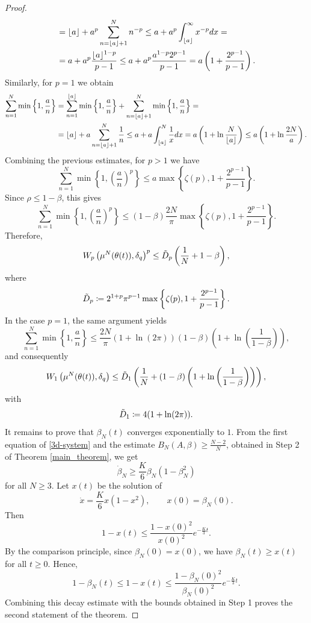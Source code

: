 \documentclass[10pt,a4paper]{amsart}
\renewcommand{\d}{\textnormal{d}}
\newcommand{\jump}{\hfill\break}
\begin{document}
\begin{proof}
\begin{align*}
           &=\lfloor a\rfloor +a^p\sum_{n=\lfloor a\rfloor+1}^N n^{-p}\leq a+a^p\int_{\lfloor a\rfloor}^\infty x^{-p}\d x=\\
           &=a+a^p\frac{\lfloor a \rfloor^{1-p}}{p-1}\leq a+a^p\frac{a^{1-p}2^{p-1}}{p-1}= a\left(1+\frac{2^{p-1}}{p-1}\right).
        \end{align*}
        Similarly, for $p=1$ we obtain
        \begin{align*}
            \sum_{n=1}^N\min\left\{1,\frac{a}{n}\right\}&=\sum_{n=1}^{\lfloor a\rfloor}\min\left\{1,\frac{a}{n}\right\}+\sum_{n=\lfloor a\rfloor+1}^N\min\left\{1,\frac{a}{n}\right\}=\\
            &=\lfloor a\rfloor +a\sum_{n=\lfloor a\rfloor+1}^N \frac{1}{n}\leq a+a\int_{\lfloor a\rfloor}^N \frac{1}{x}\d x=a\left(1+\ln\frac{N}{\lfloor a\rfloor}\right)\leq a\left(1+\ln\frac{2N}{a}\right).
        \end{align*}
        Combining the previous estimates, for $p>1$ we have
        $$ \sum_{n=1}^N \min\left\{1,\left(\frac{a}{n}\right)^p\right\} \leq a\max\left\{\zeta(p),1+\frac{2^{p-1}}{p-1}\right\}. $$
        Since $\rho\leq1-\beta$, this gives 
        $$ \sum_{n=1}^N \min\left\{1,\left(\frac{a}{n}\right)^p\right\} \leq (1-\beta)\frac{2N}{\pi} \max\left\{\zeta(p),1+\frac{2^{p-1}}{p-1}\right\}. $$
        Therefore,
        $$ W_p\left(\mu^N(\theta(t)),\delta_q\right)^p \leq \Tilde{D}_p \left( \frac{1}{N} + 1-\beta \right), $$
        where
        $$ \Tilde{D}_p\coloneqq 2^{1+p}\pi^{p-1} \max\left\{\zeta(p),1+\frac{2^{p-1}}{p-1}\right\}. $$
        In the case $p=1$, the same argument yields
        $$ \sum_{n=1}^N \min\left\{1,\frac{a}{n}\right\} \leq \frac{2N}{\pi} \left(1+\ln(2\pi)\right) (1-\beta) \left( 1+\ln\left(\frac{1}{1-\beta}\right) \right), $$
        and consequently
        $$ W_1\left(\mu^N(\theta(t)),\delta_q\right) \leq \Tilde{D}_1 \left( \frac{1}{N} + (1-\beta) \left( 1+\ln\left(\frac{1}{1-\beta}\right) \right) \right), $$
        with
        $$ \Tilde{D}_1\coloneqq4(1+\ln(2\pi)). $$\jump\noindent {} It remains to prove that $\beta_N(t)$ converges exponentially to $1$. From the first equation of \eqref{3d-system} and the estimate $B_N(A,\beta)\geq\frac{N-2}{N}$, obtained in Step 2 of Theorem \ref{main_theorem}, we get $$ \dot{\beta}_N \geq \frac{K}{6}\beta_N(1-\beta_N^2) $$ for all $N\geq3$. Let $x(t)$ be the solution of
        $$ \dot{x} = \frac{K}{6}x(1-x^2), \qquad x(0)=\beta_N(0). $$
        Then
        $$ 1-x(t) \leq \frac{1-x(0)^2}{x(0)^2} e^{-\frac{K}{3}t}. $$
        By the comparison principle, since $\beta_N(0)=x(0)$, we have $\beta_N(t)\geq x(t)$ for all $t\geq0$. Hence,
        $$ 1-\beta_N(t) \leq 1-x(t) \leq \frac{1-\beta_N(0)^2}{\beta_N(0)^2} e^{-\frac{K}{3}t}. $$
        Combining this decay estimate with the bounds obtained in Step 1 proves the second statement of the theorem.
        \end{proof}
\end{document}
